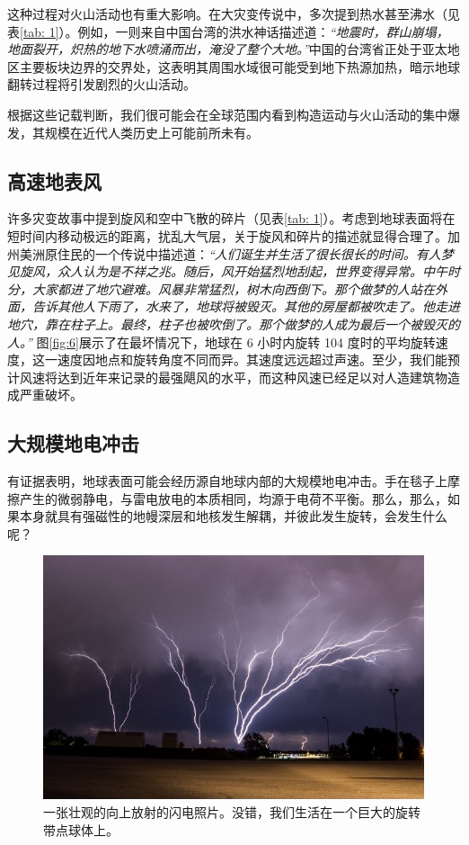 \documentclass[10pt,twocolumn,letterpaper]{article}
\begin{document}
这种过程对火山活动也有重大影响。在大灾变传说中，多次提到热水甚至沸水（见表\ref{tab: 1}）。例如，一则来自中国台湾的洪水神话描述道：\textit{“地震时，群山崩塌，地面裂开，炽热的地下水喷涌而出，淹没了整个大地。”}\cite{17}中国的台湾省正处于亚太地区主要板块边界的交界处，这表明其周围水域很可能受到地下热源加热，暗示地球翻转过程将引发剧烈的火山活动。

根据这些记载判断，我们很可能会在全球范围内看到构造运动与火山活动的集中爆发，其规模在近代人类历史上可能前所未有。
\subsection{高速地表风}

许多灾变故事中提到旋风和空中飞散的碎片（见表\ref{tab: 1}）。考虑到地球表面将在短时间内移动极远的距离，扰乱大气层，关于旋风和碎片的描述就显得合理了。加州美洲原住民的一个传说中描述道：\textit{“人们诞生并生活了很长很长的时间。有人梦见旋风，众人认为是不祥之兆。随后，风开始猛烈地刮起，世界变得异常。中午时分，大家都进了地穴避难。风暴非常猛烈，树木向西倒下。那个做梦的人站在外面，告诉其他人下雨了，水来了，地球将被毁灭。其他的房屋都被吹走了。他走进地穴，靠在柱子上。最终，柱子也被吹倒了。那个做梦的人成为最后一个被毁灭的人。”} \cite{17}图\ref{fig:6}展示了在最坏情况下，地球在 6 小时内旋转 104 度时的平均旋转速度，这一速度因地点和旋转角度不同而异。其速度远远超过声速。至少，我们能预计风速将达到近年来记录的最强飓风的水平，而这种风速已经足以对人造建筑物造成严重破坏。
\subsection{大规模地电冲击}

有证据表明，地球表面可能会经历源自地球内部的大规模地电冲击。手在毯子上摩擦产生的微弱静电，与雷电放电的本质相同，均源于电荷不平衡。那么，那么，如果本身就具有强磁性的地幔深层和地核发生解耦，并彼此发生旋转，会发生什么呢？

\begin{figure}[t]
\begin{center}
   \includegraphics[width=1\linewidth]{lightning.jpg}
\end{center}
   \caption{一张壮观的向上放射的闪电照片。没错，我们生活在一个巨大的旋转带点球体上。 \cite{22}}
\label{fig:7}
\label{fig:onecol}
\end{figure}
\end{document}
